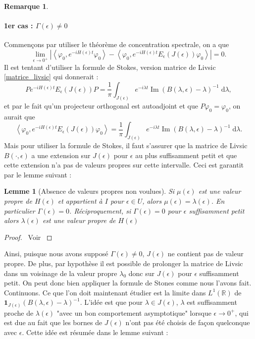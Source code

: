 \documentclass[12pt,openany,a4paper, titlepage]{article}
\newcommand{\f}[2]{\frac{#1}{#2}}
\newcommand{\lp}{\left(}
\newcommand{\rp}{\right)}
\newcommand{\la}{\left\langle}
\newcommand{\ra}{\right\rangle}
\newcommand{\dd}{\;\mathrm{d}}
\newcommand{\R}{\mathbb{R}}
\newcommand{\vp}{\varphi}
\newcommand{\im}{\operatorname{Im}}
\newtheorem{lem}{Lemme}
\theoremstyle{definition}
\theoremstyle{definition}
\theoremstyle{definition}
\theoremstyle{definition}
\theoremstyle{definition}
\newtheorem{rem}{Remarque}
\theoremstyle{definition}
\begin{document}
\begin{rem}
\paragraph{1er cas : $\Gamma(\epsilon) \neq 0$}
Commençons par utiliser le théorème de concentration spectrale, on a que 
\begin{equation}
    \lim\limits_{\epsilon \rightarrow 0^+} \left|\la \vp_0, e^{-iH(\epsilon)t} \vp_0 \ra - \la \vp_0, e^{-iH(\epsilon)t} E_\epsilon(J(\epsilon))\vp_0 \ra \right| = 0.
\end{equation}
Il est tentant d'utiliser la formule de Stokes, version matrice de Livsic \ref{matrice_livsic} qui donnerait :
\begin{equation}
    Pe^{-iH(\epsilon)t} E_\epsilon(J(\epsilon))P = \f{1}{\pi} \int_{J(\epsilon)} e^{-i\lambda t}\im \lp B(\lambda,\epsilon) - \lambda \rp^{-1} \dd \lambda,
\end{equation}
et par le fait qu'un projecteur orthogonal est autoadjoint et que $P\vp_0 = \vp_0$, on aurait que 
\begin{equation}
    \la \vp_0, e^{-iH(\epsilon)t} E_\epsilon(J(\epsilon))\vp_0 \ra = \f{1}{\pi} \int_{J(\epsilon)} e^{-i\lambda t}\im \lp B(\lambda,\epsilon) - \lambda \rp^{-1} \dd \lambda .
\end{equation}
Mais pour utiliser la formule de Stokes, il faut s'assurer que la matrice de Livsic $B(\cdot,\epsilon)$ a une extension sur $J(\epsilon)$ pour $\epsilon$ au plus suffisamment petit et que cette extension n'a pas de valeurs propres sur cette intervalle. Ceci est garantit par le lemme suivant :
\begin{lem}[Absence de valeurs propres non voulues]\label{absence_unwanted}
    Si $\mu(\epsilon)$ est une valeur propre de $H(\epsilon)$ et appartient à $I$ pour $\epsilon \in U$, alors $\mu(\epsilon) = \lambda(\epsilon)$. En particulier $\Gamma(\epsilon) = 0$. Réciproquement, si $\Gamma(\epsilon) = 0$ pour $\epsilon$ suffisamment petit alors $\lambda(\epsilon)$ est une valeur propre de $H(\epsilon)$
\end{lem}

\begin{proof}
\,
Voir \cite{Orth1990}
\end{proof}

Ainsi, puisque nous avons supposé $\Gamma(\epsilon)\neq 0$, $J(\epsilon)$ ne contient pas de valeur propre. De plus, par hypothèse il est possible de prolonger la matrice de Livsic dans un voisinage de la valeur propre $\lambda_0$ donc sur $J(\epsilon)$ pour $\epsilon$ suffisamment petit. On peut donc bien appliquer la formule de Stones comme nous l'avons fait. Continuons. Ce que l'on doit maintenant étudier est la limite dans $L^1(\R)$ de $\mathbf{1}_{J(\epsilon)}\lp B(\lambda,\epsilon) - \lambda \rp^{-1}$. L'idée est que pour $\lambda\in J(\epsilon)$, $\lambda$ est suffisamment proche de $\lambda(\epsilon)$ "avec un bon comportement asymptotique" lorsque $\epsilon \rightarrow 0^+$, qui est due au fait que les bornes de $J(\epsilon)$ n'ont pas été choisis de façon quelconque avec $\epsilon$. Cette idée est résumée dans le lemme suivant :


\end{rem}
\end{document}

